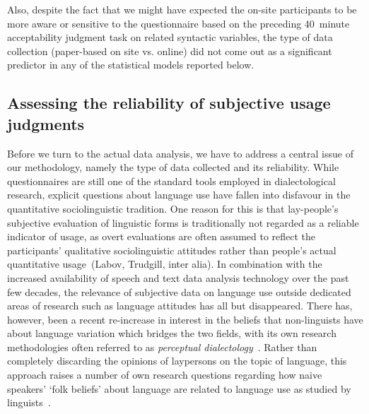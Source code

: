 Also, despite the fact that we might have expected the on-site participants to be more aware or sensitive to the questionnaire based on the preceding 40~minute acceptability judgment task on related syntactic variables, the type of data collection (paper-based on site vs. online) did not come out as a significant predictor in any of the statistical models reported below.


\subsection{Assessing the reliability of subjective usage judgments}\label{sec:judgmentcorrelation}

Before we turn to the actual data analysis, we have to address a central issue of our methodology, namely the type of data collected and its reliability. While questionnaires are still one of the standard tools employed in dialectological research, explicit questions about language use have fallen into disfavour in the quantitative sociolinguistic tradition. One reason for this is that lay-people's subjective evaluation of linguistic forms is traditionally not regarded as a reliable indicator of usage, as overt evaluations are often assumed to reflect the participants' qualitative sociolinguistic attitudes rather than people's actual quantitative usage~(Labov, Trudgill, inter alia).
In combination with the increased availability of speech and text data analysis technology over the past few decades, the relevance of subjective data on language use outside dedicated areas of research such as language attitudes has all but disappeared.
There has, however, been a recent re-increase in interest in the beliefs that non-linguists have about language variation which bridges the two fields, with its own research methodologies often referred to as \emph{perceptual dialectology}~\citep{Montgomery2011}. %
Rather than completely discarding the opinions of laypersons on the topic of language, this approach raises a number of own research questions regarding how naive speakers' `folk beliefs' about language are related to language use as studied by linguists~\citep{Preston1996}.

